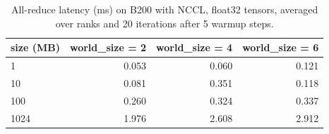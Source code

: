 \begin{table}
\centering
\begin{tabular}{lrrr}
\toprule
size (MB) & world\_size = 2 & world\_size = 4 & world\_size = 6 \\
\midrule
1 & 0.053 & 0.060 & 0.121 \\
10 & 0.081 & 0.351 & 0.118 \\
100 & 0.260 & 0.324 & 0.337 \\
1024 & 1.976 & 2.608 & 2.912 \\
\bottomrule
\end{tabular}
\caption{All-reduce latency (ms) on B200 with NCCL, float32 tensors, averaged over ranks and 20 iterations after 5 warmup steps.}
\label{tab:all_reduce_single_node}
\end{table}
